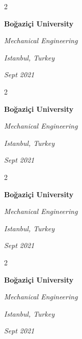 \documentclass[10pt, letterpaper]{article}
\newenvironment{twocolentry}[2][]{
    \onecolentry
    \def\secondColumn{#2}
    \setcolumnwidth{\fill, 4.5 cm}
    \begin{paracol}{2}
}{
    \switchcolumn \raggedleft \secondColumn
    \end{paracol}
    \endonecolentry
} %
\begin{document}
        \vspace{0.2 cm}

        \begin{twocolentry}{
        \textit{Istanbul, Turkey}    
            
        \textit{Sept 2021}}
            \textbf{Boğaziçi University}

            \textit{Mechanical Engineering}
        \end{twocolentry}



        \vspace{0.2 cm}

        \begin{twocolentry}{
        \textit{Istanbul, Turkey}    
            
        \textit{Sept 2021}}
            \textbf{Boğaziçi University}

            \textit{Mechanical Engineering}
        \end{twocolentry}



        \vspace{0.2 cm}

        \begin{twocolentry}{
        \textit{Istanbul, Turkey}    
            
        \textit{Sept 2021}}
            \textbf{Boğaziçi University}

            \textit{Mechanical Engineering}
        \end{twocolentry}



        \vspace{0.2 cm}

        \begin{twocolentry}{
        \textit{Istanbul, Turkey}    
            
        \textit{Sept 2021}}
            \textbf{Boğaziçi University}

            \textit{Mechanical Engineering}
        \end{twocolentry}
\end{document}
